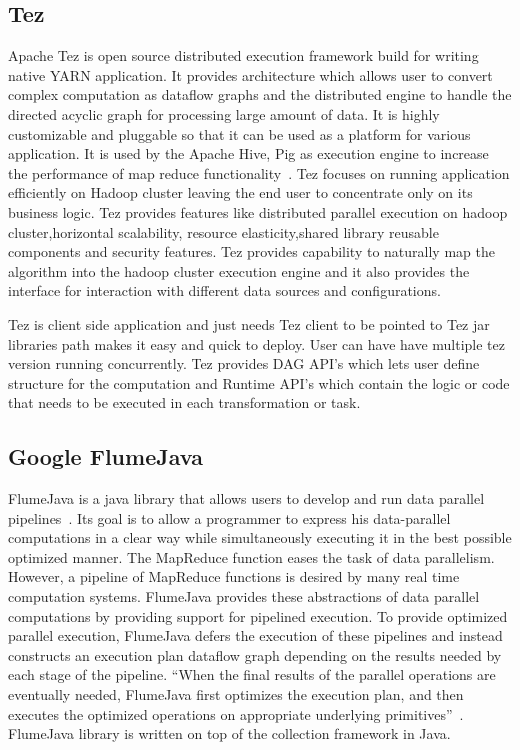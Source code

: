 \pv


\subsection{Tez}

Apache Tez is open source distributed execution framework build for
writing native YARN application. It provides architecture which allows
user to convert complex computation as dataflow graphs and the
distributed engine to handle the directed acyclic graph for processing
large amount of data. It is highly customizable and pluggable so that
it can be used as a platform for various application. It is used by
the Apache Hive, Pig as execution engine to increase the performance
of map reduce functionality~\cite{www-apache-tez}. Tez focuses on
running application efficiently on Hadoop cluster leaving the end user
to concentrate only on its business logic. Tez provides features like
distributed parallel execution on hadoop cluster,horizontal
scalability, resource elasticity,shared library reusable components
and security features. Tez provides capability to naturally map the
algorithm into the hadoop cluster execution engine and it also
provides the interface for interaction with different data sources and
configurations.
	
    Tez is client side application and just needs Tez client to be
    pointed to Tez jar libraries path makes it easy and quick to
    deploy. User can have have multiple tez version running
    concurrently. Tez provides DAG API's which lets user define
    structure for the computation and Runtime API's which contain the
    logic or code that needs to be executed in each transformation or
    task.

\subsection{Google FlumeJava \vc}

FlumeJava is a java library that allows users to develop and run data
parallel pipelines~\cite{www-flumejava-google}. Its goal is to allow a
programmer to express his data-parallel computations in a clear way
while simultaneously executing it in the best possible optimized
manner. The MapReduce function eases the task of data
parallelism. However, a pipeline of MapReduce functions is desired by
many real time computation systems. FlumeJava provides these
abstractions of data parallel computations by providing support for
pipelined execution. To provide optimized parallel execution,
FlumeJava defers the execution of these pipelines and instead
constructs an execution plan dataflow graph depending on the results
needed by each stage of the pipeline. ``When the final results of the
parallel operations are eventually needed, FlumeJava first optimizes
the execution plan, and then executes the optimized operations on
appropriate underlying primitives''~\cite{flumejava-paper}. FlumeJava
library is written on top of the collection framework in Java.

